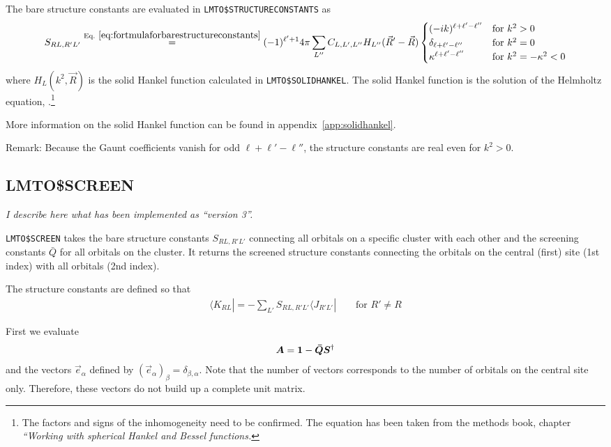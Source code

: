 \documentclass[11pt,a4paper]{report}
\begin{document}
The bare structure constants are evaluated in 
\verb|LMTO$STRUCTURECONSTANTS| as
\begin{eqnarray}
S_{RL,R'L'}\eqrel{eq:fortmulaforbarestructureconstants}{=}
(-1)^{\ell'+1} 4\pi \sum_{L''} C_{L,L',L''} 
H_{L''}(\vec{R}'-\vec{R})
\begin{cases}
(-ik)^{\ell+\ell'-\ell''}&\text{for $k^2>0$}\\
\delta_{\ell+\ell'-\ell''}&\text{for $k^2=0$}\\
\kappa^{\ell+\ell'-\ell''}&\text{for $k^2=-\kappa^2<0$}\\
\end{cases}
\label{eq:fortmulaforbarestructureconstantscopy1}
\end{eqnarray}
where $H_L(k^2,\vec{R})$ is the solid Hankel function calculated in
\verb|LMTO$SOLIDHANKEL|. The solid Hankel function is the solution of
the Helmholtz equation, .\footnote{The
  factors and signs of the inhomogeneity need to be confirmed. The
  equation has been taken from the methods book, chapter
  \textit{``Working with spherical Hankel and Bessel functions.}}

More information on the solid Hankel function can be found in
appendix~\ref{app:solidhankel}.

Remark: Because the Gaunt coefficients vanish for odd
$\ell+\ell'-\ell''$, the structure constants are real even for
$k^2>0$.


\subsection{LMTO\$SCREEN}
\textit{I describe here what has been implemented as ``version 3''.}

\verb|LMTO$SCREEN| takes the bare structure constants $S_{RL,R'L'}$
connecting all orbitals on a specific cluster with each other and the
screening constants $\bar{Q}$ for all orbitals on the cluster. It
returns the screened structure constants connecting the orbitals on
the central (first) site (1st index) with all orbitals (2nd index).

The structure constants are defined so that
\begin{eqnarray}
\langle K_{RL}|=-\sum_{L'} S_{RL,R'L'}\langle J_{R'L'}|
\qquad\text{for $R'\neq R$}
\end{eqnarray}

First we evaluate 
\begin{eqnarray}
\bm{A}=\bm{1}-\bm{\bar{Q}}\bm{S}^\dagger
\end{eqnarray}
and the vectors $\vec{e}_\alpha$ defined by
$(\vec{e}_\alpha)_\beta=\delta_{\beta,\alpha}$. Note that the number
of vectors corresponds to the number of orbitals on the central site
only. Therefore, these vectors do not build up a complete unit matrix.
\end{document}
